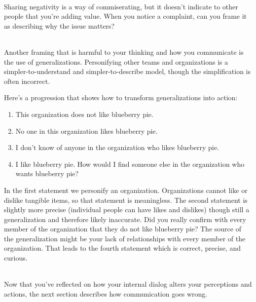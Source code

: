 \ \\
Sharing negativity is a way of commiserating, but it doesn't indicate to other people that you're adding value.  
When you notice a complaint, can you frame it as describing why the issue matters? 

\ \\

Another framing that is harmful to your thinking and how you communicate is the use of generalizations. Personifying other teams and organizations is a simpler-to-understand and simpler-to-describe model, though the simplification is often incorrect. 

Here's a progression that shows how to transform generalizations into action: 
\begin{enumerate}
    \item This organization does not like blueberry pie.
    \item No one in this organization likes blueberry pie.
    \item I don't know of anyone in the organization who likes blueberry pie.
    \item I like blueberry pie. How would I find someone else in the organization who wants blueberry pie?
\end{enumerate}
In the first statement we personify an organization. Organizations cannot like or dislike tangible items, so that statement is meaningless. The second statement is slightly more precise (individual people can have likes and dislikes) though still a generalization and therefore likely inaccurate. Did you really confirm with every member of the organization that they do not like blueberry pie? The source of the generalization might be your lack of relationships with every member of the organization. That leads to the fourth statement which is correct, precise, and curious. 

\ \\

Now that you've reflected on how your internal dialog alters your perceptions and actions, the next section describes how communication goes wrong.